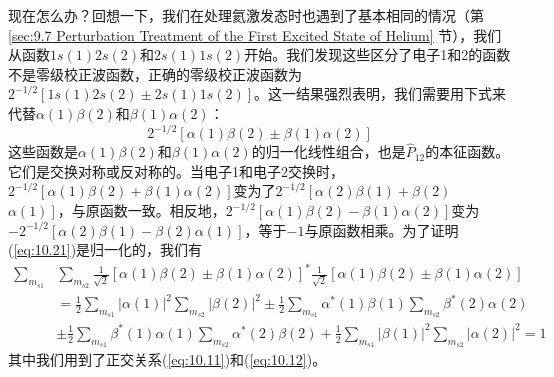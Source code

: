     现在怎么办？回想一下，我们在处理氦激发态时也遇到了基本相同的情况（第 \ref{sec:9.7 Perturbation Treatment of the First Excited State of Helium} 节），我们从函数$1s\left(1\right)2s\left(2\right)$和$2s\left(1\right)1s\left(2\right)$开始。我们发现这些区分了电子1和2的函数不是零级校正波函数，正确的零级校正波函数为$2^{-1/2}\left[1s\left(1\right)2s\left(2\right) \pm 2s\left(1\right)1s\left(2\right)\right]$。这一结果强烈表明，我们需要用下式来代替$\alpha\left(1\right)\beta\left(2\right)$和$\beta\left(1\right)\alpha\left(2\right)$：
    \begin{equation}
        2^{-1/2}\left[\alpha\left(1\right)\beta\left(2\right) \pm \beta\left(1\right)\alpha\left(2\right)\right]
        \label{eq:10.21}
    \end{equation}
    这些函数是$\alpha\left(1\right)\beta\left(2\right)$和$\beta\left(1\right)\alpha\left(2\right)$的归一化线性组合，也是$\hat{P}_{12}$的本征函数。它们是交换对称或反对称的。当电子1和电子2交换时，$2^{-1/2}\left[\alpha\left(1\right)\beta\left(2\right) + \beta\left(1\right)\alpha\left(2\right)\right]$变为了$2^{-1/2}\left[\alpha\left(2\right)\beta\left(1\right) + \beta\left(2\right)\right.$\\$\left.\alpha\left(1\right)\right]$，与原函数一致。相反地，$2^{-1/2}\left[\alpha\left(1\right)\beta\left(2\right) - \beta\left(1\right)\alpha\left(2\right)\right]$变为$-2^{-1/2}\left[\alpha\left(2\right)\beta\left(1\right) - \beta\left(2\right)\alpha\left(1\right)\right]$，等于$-1$与原函数相乘。为了证明(\ref{eq:10.21})是归一化的，我们有
    \begin{equation*}
        \begin{aligned}
            \sum_{m_{s1}} & \sum_{m_{s2}} \frac{1}{\sqrt{2}} \left[\alpha\left(1\right) \beta\left(2\right) \pm \beta\left(1\right) \alpha\left(2\right)\right]^* \frac{1}{\sqrt{2}} \left[\alpha\left(1\right) \beta\left(2\right) \pm \beta\left(1\right) \alpha\left(2\right)\right] \\
            & = \frac{1}{2} \sum_{m_{s1}} \left|\alpha\left(1\right)\right|^{2} \sum_{m_{s2}} \left|\beta\left(2\right)\right|^{2} \pm \frac{1}{2} \sum_{m_{s1}} \alpha^{*}\left(1\right) \beta\left(1\right) \sum_{m_{s2}} \beta^{*}\left(2\right) \alpha\left(2\right) \\
            & \pm \frac{1}{2} \sum_{m_{s1}} \beta^{*}\left(1\right)\alpha\left(1\right) \sum_{m_{s2}} \alpha^{*}\left(2\right)\beta\left(2\right) + \frac{1}{2} \sum_{m_{s1}} \left|\beta\left(1\right)\right|^{2} \sum_{m_{s2}} \left|\alpha\left(2\right)\right|^{2} = 1
        \end{aligned}
    \end{equation*}
    其中我们用到了正交关系(\ref{eq:10.11})和(\ref{eq:10.12})。

